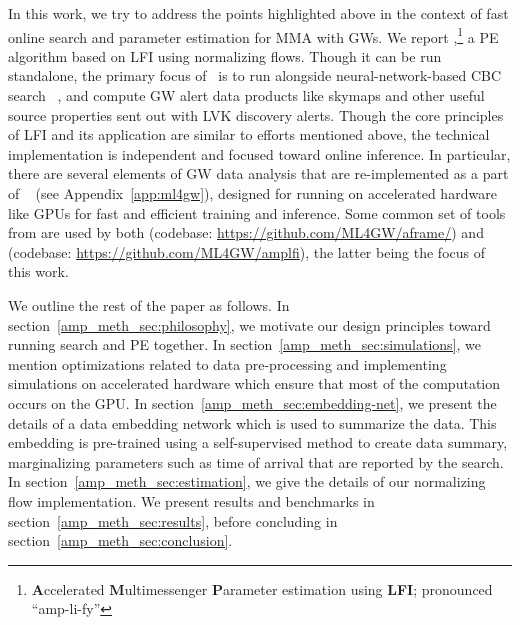 \begin{refsection}
In this work, we try to address the points highlighted above in the context of fast online search and parameter estimation for MMA with GWs. 
We report \amplfi,\footnote{\textbf{A}ccelerated \textbf{M}ultimessenger \textbf{P}arameter estimation using \textbf{LFI}; pronounced ``amp-li-fy''} a PE algorithm based on LFI using normalizing flows.
Though it can be run standalone, the primary focus of \amplfi~is to run alongside neural-network-based CBC search {\aframe}~\cite{aframe-methods}, and compute GW alert data products like skymaps and other useful source properties sent out with LVK discovery alerts. 
Though the core principles of LFI and its application are similar to efforts mentioned above, the technical implementation is independent and focused toward online inference. 
In particular, there are several elements of GW data analysis that are re-implemented as a part of {\mlgw}~\cite{Benoit2025} (see Appendix~\ref{app:ml4gw}), designed for running on accelerated hardware like GPUs for fast and efficient training and inference. 
Some common set of tools from {\mlgw} are used by both {\aframe} (codebase: \url{https://github.com/ML4GW/aframe/}) and {\amplfi} (codebase: \url{https://github.com/ML4GW/amplfi}), the latter being the focus of this work. 

We outline the rest of the paper as follows. In section~\ref{amp_meth_sec:philosophy}, we motivate our design principles toward running search and PE together. 
In section~\ref{amp_meth_sec:simulations}, we mention optimizations related to data pre-processing and implementing simulations on accelerated hardware which ensure that most of the computation occurs on the GPU. 
In section~\ref{amp_meth_sec:embedding-net}, we present the details of a data embedding network which is used to summarize the data. 
This embedding is pre-trained using a self-supervised method to create data summary, marginalizing parameters such as time of arrival that are reported by the search. 
In section~\ref{amp_meth_sec:estimation}, we give the details of our normalizing flow implementation. We present results and benchmarks in section~\ref{amp_meth_sec:results}, before concluding in section~\ref{amp_meth_sec:conclusion}.



\end{refsection}
